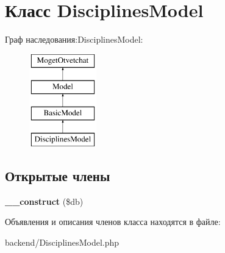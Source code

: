 \hypertarget{classDisciplinesModel}{}\section{Класс Disciplines\+Model}
\label{classDisciplinesModel}
Граф наследования\+:Disciplines\+Model\+:\begin{figure}[H]
\begin{center}
\leavevmode
\includegraphics[height=4.000000cm]{classDisciplinesModel}
\end{center}
\end{figure}
\subsection*{Открытые члены}
\begin{DoxyCompactItemize}
\item 
\hypertarget{classDisciplinesModel_a7c8da1c7efc4bf05398ad5f53de5c26f}{}{\bfseries \+\_\+\+\_\+construct} (\$db)\label{classDisciplinesModel_a7c8da1c7efc4bf05398ad5f53de5c26f}

\end{DoxyCompactItemize}


Объявления и описания членов класса находятся в файле\+:\begin{DoxyCompactItemize}
\item 
backend/Disciplines\+Model.\+php\end{DoxyCompactItemize}
